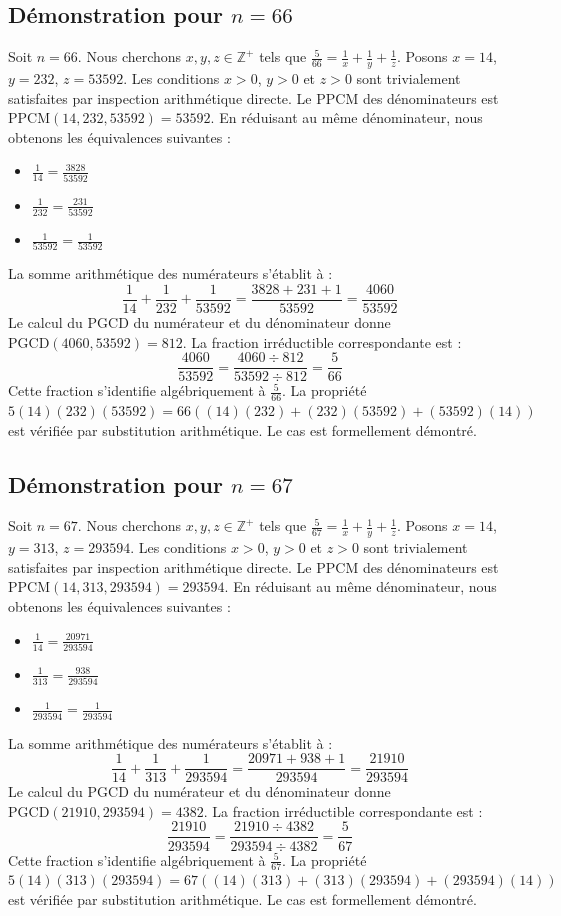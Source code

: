 \documentclass[12pt,a4paper]{article}
\begin{document}
\subsection{Démonstration pour $n = 66$}
Soit $n = 66$. Nous cherchons $x, y, z \in \mathbb{Z}^{+}$ tels que $\frac{5}{66} = \frac{1}{x} + \frac{1}{y} + \frac{1}{z}$.
Posons $x = 14$, $y = 232$, $z = 53592$.
Les conditions $x > 0$, $y > 0$ et $z > 0$ sont trivialement satisfaites par inspection arithmétique directe.
Le PPCM des dénominateurs est $\text{PPCM}(14, 232, 53592) = 53592$.
En réduisant au même dénominateur, nous obtenons les équivalences suivantes :
\begin{itemize}
    \item $\frac{1}{14} = \frac{3828}{53592}$
    \item $\frac{1}{232} = \frac{231}{53592}$
    \item $\frac{1}{53592} = \frac{1}{53592}$
\end{itemize}
La somme arithmétique des numérateurs s'établit à :
$$ \frac{1}{14} + \frac{1}{232} + \frac{1}{53592} = \frac{3828 + 231 + 1}{53592} = \frac{4060}{53592} $$
Le calcul du PGCD du numérateur et du dénominateur donne $\text{PGCD}(4060, 53592) = 812$.
La fraction irréductible correspondante est :
$$ \frac{4060}{53592} = \frac{4060 \div 812}{53592 \div 812} = \frac{5}{66} $$
Cette fraction s'identifie algébriquement à $\frac{5}{66}$.
La propriété $5(14)(232)(53592) = 66((14)(232) + (232)(53592) + (53592)(14))$ est vérifiée par substitution arithmétique.
Le cas est formellement démontré.

\subsection{Démonstration pour $n = 67$}
Soit $n = 67$. Nous cherchons $x, y, z \in \mathbb{Z}^{+}$ tels que $\frac{5}{67} = \frac{1}{x} + \frac{1}{y} + \frac{1}{z}$.
Posons $x = 14$, $y = 313$, $z = 293594$.
Les conditions $x > 0$, $y > 0$ et $z > 0$ sont trivialement satisfaites par inspection arithmétique directe.
Le PPCM des dénominateurs est $\text{PPCM}(14, 313, 293594) = 293594$.
En réduisant au même dénominateur, nous obtenons les équivalences suivantes :
\begin{itemize}
    \item $\frac{1}{14} = \frac{20971}{293594}$
    \item $\frac{1}{313} = \frac{938}{293594}$
    \item $\frac{1}{293594} = \frac{1}{293594}$
\end{itemize}
La somme arithmétique des numérateurs s'établit à :
$$ \frac{1}{14} + \frac{1}{313} + \frac{1}{293594} = \frac{20971 + 938 + 1}{293594} = \frac{21910}{293594} $$
Le calcul du PGCD du numérateur et du dénominateur donne $\text{PGCD}(21910, 293594) = 4382$.
La fraction irréductible correspondante est :
$$ \frac{21910}{293594} = \frac{21910 \div 4382}{293594 \div 4382} = \frac{5}{67} $$
Cette fraction s'identifie algébriquement à $\frac{5}{67}$.
La propriété $5(14)(313)(293594) = 67((14)(313) + (313)(293594) + (293594)(14))$ est vérifiée par substitution arithmétique.
Le cas est formellement démontré.
\end{document}
